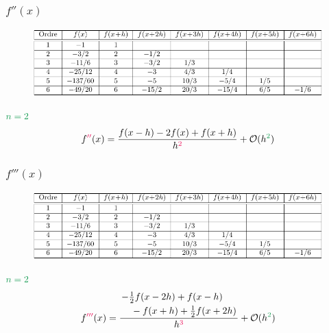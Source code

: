 \documentclass[resume]{subfiles}
\begin{document}
\subsubsection{$f''(x)$}
\begin{figure}[H]
\centering
\includegraphics[width=\columnwidth,page=6]{diff_finies_tableaux.pdf}
\end{figure}
$\textcolor{ForestGreen}{n=2}$
$$f\textcolor{OrangeRed}{''}(x)=\frac{f(x-h)-2f(x)+f(x+h)}{h^{\textcolor{OrangeRed}{2}}}+\mathcal{O}(h^{\textcolor{ForestGreen}{2}})$$
\subsubsection{$f'''(x)$}
\begin{figure}[H]
\centering
\includegraphics[width=\columnwidth,page=7]{diff_finies_tableaux.pdf}
\end{figure}
$\textcolor{ForestGreen}{n=2}$
$$f\textcolor{OrangeRed}{'''}(x)=\frac{\splitdfrac{-\frac{1}{2}f(x-2h)+f(x-h)}{-f(x+h)+\frac{1}{2}f(x+2h)}}{h^{\textcolor{OrangeRed}{3}}}+\mathcal{O}(h^{\textcolor{ForestGreen}{2}})$$
\end{document}
